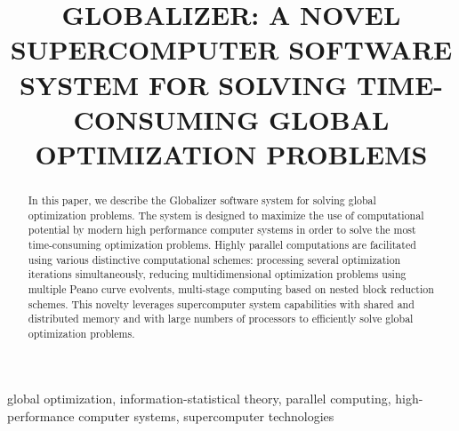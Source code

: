 \documentclass{gOMS2e}
\theoremstyle{plain}%
\theoremstyle{definition}
\theoremstyle{remark}
\begin{document}


\title{GLOBALIZER: A NOVEL SUPERCOMPUTER SOFTWARE SYSTEM FOR SOLVING TIME-CONSUMING GLOBAL OPTIMIZATION PROBLEMS}

\author{
}

\maketitle

\begin{abstract}
In this paper, we describe the Globalizer software system for solving global optimization
problems. The system is designed to maximize the use of computational potential by modern
high performance computer systems in order to solve the most time-consuming optimization
problems. Highly parallel computations are facilitated using various distinctive computational
schemes: processing several optimization iterations simultaneously, reducing multidimensional
optimization problems using multiple Peano curve evolvents, multi-stage computing based on
nested block reduction schemes. This novelty leverages supercomputer system capabilities
with shared and distributed memory and with large numbers of processors to efficiently
solve global optimization problems.
\end{abstract}

\begin{keywords}
global optimization, information-statistical theory, parallel computing, high-performance
computer systems, supercomputer technologies
\end{keywords}
\end{document}
